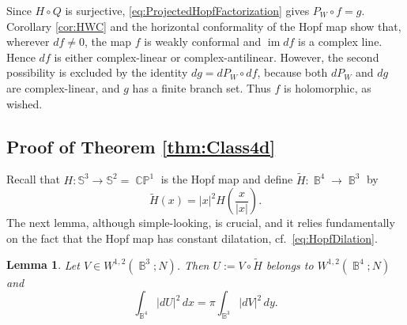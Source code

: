 \documentclass[11pt]{article}
\theoremstyle{plain}
\numberwithin{equation}{section}
\newtheorem{lemma}[theorem]{Lemma}
\theoremstyle{definition}
\let\oldendproof\endproof
\renewenvironment{proof}[1][\proofname]{%
\oldproof[\upshape \bfseries #1]%
}{\oldendproof}
\def \mb{\mathbb}
\DeclareMathOperator{\CP}{\mathbb{CP}}
\DeclareMathOperator{\B}{\mathbb{B}}
\begin{document}
\begin{proof}
Since $H\circ Q$ is surjective, \eqref{eq:ProjectedHopfFactorization} gives
$P_W\circ f=g$.  Corollary \ref{cor:HWC} and the horizontal conformality of
the Hopf map show that, wherever $df\neq0$, the map $f$ is weakly conformal and
$\operatorname{im}df$ is a complex line.  Hence $df$ is either
complex-linear or complex-antilinear.  However, the
second possibility is excluded by the identity $dg=dP_W\circ df$, because both $dP_W$ and $dg$ are complex-linear, and $g$ has a finite branch set.
Thus $f$ is holomorphic, as wished.
\end{proof}

\subsection{Proof of Theorem \ref{thm:Class4d}}

Recall that $H\colon\mb S^3\to\mb S^2= \CP^1$ is the Hopf map and define
$\widetilde H\colon\B^4\to\B^3$ by
\[
    \widetilde H(x)=|x|^2H\left(\frac{x}{|x|}\right).
\]
The next lemma, although simple-looking, is crucial, and it relies fundamentally on the fact that the Hopf map has constant dilatation, cf.\ \eqref{eq:HopfDilation}.

\begin{lemma}
    \label{lem:ProjectionEnergy}
    Let $V\in W^{1,2}(\B^3;N)$.  Then
    $U:=V\circ\widetilde H$ belongs to $W^{1,2}(\B^4;N)$ and
    \[
    \int_{\B^4}|dU|^2\,dx
    =\pi\int_{\B^3}|dV|^2\,dy.
    \]
\end{lemma}
\end{document}

